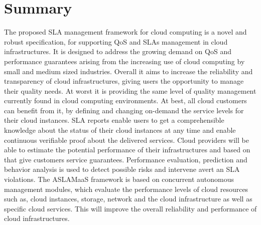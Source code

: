 \section{Summary}
The proposed SLA management framework for cloud computing is a novel and robust specification, for supporting QoS and SLAs management in cloud infrastructures. It is designed to address the growing demand on QoS and performance guarantees arising from the increasing use of cloud computing by small and medium sized industries. Overall it aims to increase the reliability and transparency of cloud infrastructures, giving users the opportunity to manage their quality needs. At worst it is providing the same level of quality management currently found in cloud computing environments. At best, all cloud customers can benefit from it, by defining and changing on-demand the service levels for their cloud instances. SLA reports enable users to get a comprehensible knowledge about the status of their cloud instances at any time and enable continuous verifiable proof about the delivered services. Cloud providers will be able to estimate the potential performance of their infrastructures and based on that give customers service guarantees. Performance evaluation, prediction and behavior analysis is used to detect possible risks and intervene avert an SLA violations. The ASLAMaaS framework is based on concurrent autonomous management modules, which  evaluate the performance levels of cloud resources such as, cloud instances, storage, network and the cloud infrastructure as well as specific cloud services. This will improve the overall reliability and performance of cloud infrastructures.